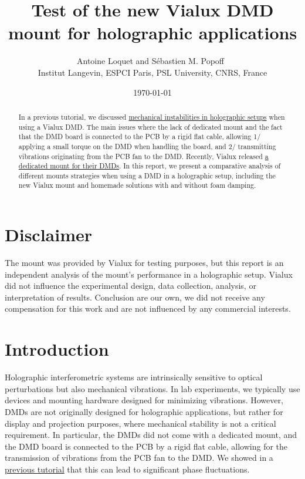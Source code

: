 \documentclass[11pt,a4paper]{article}
\title{Test of the new Vialux DMD mount for holographic applications}
\author{Antoine Loquet and Sébastien M. Popoff~\orcidlink{0000-0002-7199-9814}\\[0.5em]
\small Institut Langevin, ESPCI Paris, PSL University, CNRS, France}
\date{\today}
\begin{document}
\maketitle

\begin{abstract}
	In a previous tutorial, we discussed \href{https://www.wavefrontshaping.net/post/id/25}{mechanical instabilities in holographic setups}
	when using a Vialux DMD.
	The main issues where the lack of dedicated mount and the fact that the DMD board is
	connected to the PCB by a rigid flat cable,
	allowing
	1/ applying a small torque on the DMD when handling the board, and
	2/ transmitting vibrations originating from the PCB fan to the DMD.
	Recently, Vialux released
	\href{https://www.vialux.de/ViALUX-Website/dmd-mounting-material_accessories.html}{a dedicated mount for their DMDs}.
	In this report, we present a comparative analysis of different mounts strategies
	when using a DMD in a holographic setup, including the new Vialux mount and homemade solutions with and without foam damping.
\end{abstract}

\section*{Disclaimer}

The mount was provided by Vialux for testing purposes,
but this report is an independent analysis of the mount's performance in a holographic setup.
Vialux did not influence the experimental design, data collection, analysis, or interpretation of results.
Conclusion are our own, we did not receive any compensation for this work
and are not influenced by any commercial interests.

\section{Introduction}

Holographic interferometric systems are intrinsically sensitive to optical
perturbations but also mechanical vibrations. In lab experiments, we typically
use devices and mounting hardware designed for minimizing vibrations. However,
DMDs are not originally designed for holographic applications, but rather for
display and projection purposes, where mechanical stability is not a critical
requirement. In particular, the DMDs did not come with a dedicated mount, and
the DMD board is connected to the PCB by a rigid flat cable, allowing for the
transmission of vibrations from the PCB fan to the DMD. We showed in a
\href{https://www.wavefrontshaping.net/post/id/25}{previous tutorial} that this
can lead to significant phase fluctuations.\\
\end{document}
